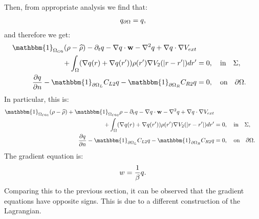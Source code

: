 Then, from appropriate analysis we find that:
\begin{align*}
{q}_{\partial \Omega} = q,
\end{align*}
and therefore we get:
\begin{align*}
\mathbbm{1}_{\Omega_{Ob}}(\rho- \widehat{\rho})   - \partial_t  \Adjb  - \nabla \Adjb \cdot \mathbf{w}  - \nabla^2 \Adjb \notag 
+  \nabla \Adjb \cdot \nabla V_{ext}  \notag \\
+ \int_\Omega (\nabla  \Adjb(r)+\nabla  \Adjb(r')) \rho(r') \nabla V_2(|r-r'|) dr' &=0, \quad \text{in} \quad \Sigma, \\
\frac{\partial \Adjb }{\partial n}  -\mathbbm{1}_{\partial \Omega_L} C_{L2} \Adjb   -\mathbbm{1}_{\partial \Omega_R} C_{R2} \Adjb&=0, \quad \text{on} \quad \partial \Omega.
\end{align*}
In particular, this is:
\begin{align*}
\mathbbm{1}_{\Omega_{Ob1}}(\rho- \widehat{\rho}) +\mathbbm{1}_{\Omega_{Ob2}}\rho  - \partial_t  \Adjb  - \nabla \Adjb \cdot \mathbf{w}  - \nabla^2 \Adjb \notag 
+  \nabla \Adjb \cdot \nabla V_{ext}  \notag \\
+ \int_\Omega (\nabla  \Adjb(r)+\nabla  \Adjb(r')) \rho(r') \nabla V_2(|r-r'|) dr' &=0, \quad \text{in} \quad \Sigma, \\
\frac{\partial \Adjb }{\partial n}  -\mathbbm{1}_{\partial \Omega_L} C_{L2} \Adjb   -\mathbbm{1}_{\partial \Omega_R} C_{R2} \Adjb&=0, \quad \text{on} \quad \partial \Omega.
\end{align*}
The gradient equation is:
\begin{align*}
w = \frac{1}{\beta}q.
\end{align*}
Comparing this to the previous section, it can be observed that the gradient equations have opposite signs. This is due to a different construction of the Lagrangian.


